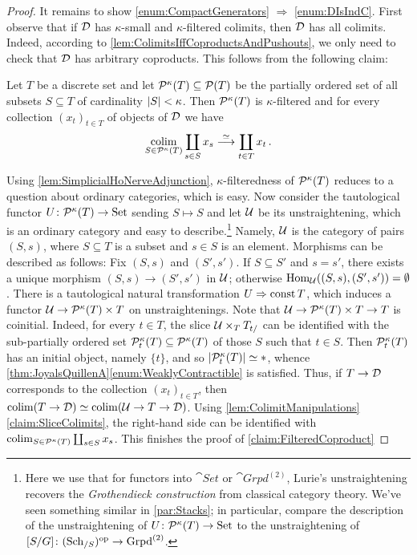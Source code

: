 \begin{proof}
	It remains to show \cref{enum:CompactGenerators} $\Rightarrow$ \cref{enum:DIsIndC}. First observe that if $\mathcal{D}$ has $\kappa$-small and $\kappa$-filtered colimits, then $\mathcal{D}$ has all colimits. Indeed, according to \cref{lem:ColimitsIffCoproductsAndPushouts}, we only need to check that $\mathcal{D}$ has arbitrary coproducts. This follows from the following claim:
	\begin{alphanumerate}\itshape
		\item[\boxtimes] Let $T$ be a discrete set and let $\mathcal{P}^{\kappa}(T)\subseteq \mathcal{P}(T)$ be the partially ordered set of all subsets $S\subseteq T$ of cardinality $\abs*{S}<\kappa$. Then $\mathcal{P}^{\kappa}(T)$ is $\kappa$-filtered and for every collection $(x_t)_{t\in T}$ of objects of $\mathcal{D}$ we have\label{claim:FilteredCoproduct}
		\begin{equation*}
			\operatorname*{colim}_{S\in\mathcal{P}^{\kappa}(T)}\coprod_{s\in S}x_s\overset{\simeq}{\longrightarrow}\coprod_{t\in T}x_t\,.
		\end{equation*}
	\end{alphanumerate}
	Using \cref{lem:SimplicialHoNerveAdjunction}, $\kappa$-filteredness of $\mathcal{P}^\kappa(T)$ reduces to a question about ordinary categories, which is easy. Now consider the tautological functor $U\colon \mathcal{P}^\kappa(T)\rightarrow\mathrm{Set}$ sending $S\mapsto S$ and let $\mathcal{U}$ be its unstraightening, which is an ordinary category and easy to describe.\footnote{Here we use that for functors into $\cat{Set}$ or $\cat{Grpd}^{(2)}$, Lurie's unstraightening recovers the \emph{Grothendieck construction} from classical category theory. We've seen something similar in \cref{par:Stacks}; in particular, compare the description of the unstraightening of $U\colon \mathcal{P}^\kappa(T)\rightarrow \mathrm{Set}$ to the unstraightening of $[S/G]\colon (\mathrm{Sch}_{/S})^{\mathrm{op}}\rightarrow \mathrm{Grpd}^{(2)}$.} Namely, $\mathcal{U}$ is the category of pairs $(S,s)$, where $S\subseteq T$ is a subset and $s\in S$ is an element. Morphisms can be described as follows: Fix $(S,s)$ and $(S',s')$. If $S\subseteq S'$ and $s=s'$, there exists a unique morphism $(S,s)\rightarrow(S',s')$ in $\mathcal{U}$; otherwise $\operatorname{Hom}_{\mathcal{U}}((S,s),(S',s'))=\emptyset$. There is a tautological natural transformation $U\Rightarrow\operatorname{const} T$, which induces a functor $\mathcal{U}\rightarrow \mathcal{P}^\kappa(T)\times T$ on unstraightenings. Note that $\mathcal{U}\rightarrow \mathcal{P}^\kappa(T)\times T\rightarrow T$ is coinitial. Indeed, for every $t\in T$, the slice $\mathcal{U}\times_TT_{t/}$ can be identified with the sub-partially ordered set $\mathcal{P}_t^\kappa(T)\subseteq \mathcal{P}^\kappa(T)$ of those $S$ such that $t\in S$. Then $\mathcal{P}_t^\kappa(T)$ has an initial object, namely $\{t\}$, and so $\mathopen|\mathcal{P}_t^\kappa(T)\mathclose|\simeq *$, whence \cref{thm:JoyalsQuillenA}\cref{enum:WeaklyContractible} is satisfied. Thus, if $T\rightarrow \mathcal{D}$ corresponds to the collection $(x_t)_{t\in T}$, then $\operatorname*{colim}(T\rightarrow\mathcal{D})\simeq \operatorname*{colim}(\mathcal{U}\rightarrow T\rightarrow\mathcal{D})$. Using \cref{lem:ColimitManipulations}\cref{claim:SliceColimits}, the right-hand side can be identified with $\operatorname*{colim}_{S\in\mathcal{P}^\kappa(T)}\coprod_{s\in S}x_s$. This finishes the proof of \cref{claim:FilteredCoproduct}
	

\end{proof}
